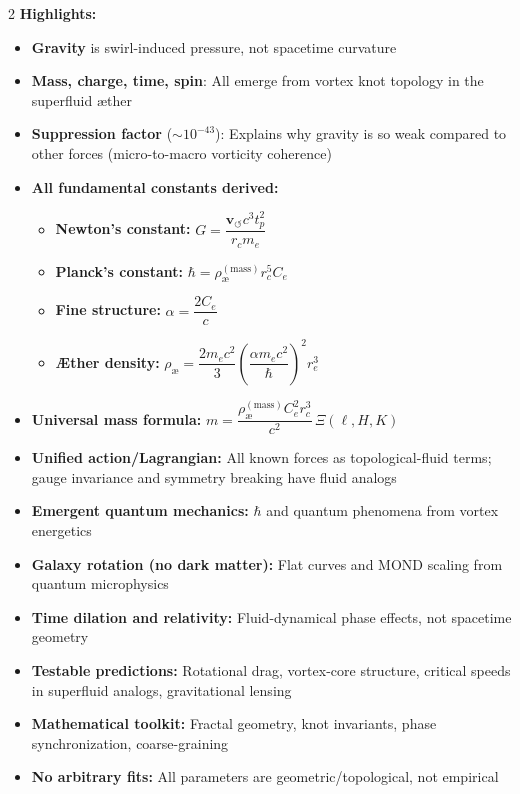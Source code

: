 \documentclass{article}
\begin{document}
\begin{center}
    \begin{multicols}{2}
        \footnotesize
        \textbf{Highlights:}
        \begin{itemize}
            \item \textbf{Gravity} is swirl-induced pressure, not spacetime curvature
            \item \textbf{Mass, charge, time, spin}: All emerge from vortex knot topology in the superfluid æther
            \item \textbf{Suppression factor} ($\sim 10^{-43}$): Explains why gravity is so weak compared to other forces (micro-to-macro vorticity coherence)
            \item \textbf{All fundamental constants derived:}
            \begin{itemize}
                \item \textbf{Newton's constant:} $G = \dfrac{\mathbf{v}_{\scriptscriptstyle\boldsymbol{\circlearrowleft}} c^3 t_p^2}{r_c m_e}$
                \item \textbf{Planck's constant:} $\hbar = \rho_{\text{\ae}}^{(\text{mass})} r_c^5 C_e$
                \item \textbf{Fine structure:} $\alpha = \dfrac{2 C_e}{c}$
                \item \textbf{Æther density:} $\rho_{\text{\ae}} = \dfrac{2 m_e c^2}{3} \left(\dfrac{\alpha m_e c^2}{\hbar}\right)^2 r_e^3$
            \end{itemize}
            \item \textbf{Universal mass formula:} $m = \dfrac{\rho_{\text{\ae}}^{(\text{mass})} C_e^2 r_c^3}{c^2} \, \Xi(\ell, H, K)$
            \item \textbf{Unified action/Lagrangian:} All known forces as topological-fluid terms; gauge invariance and symmetry breaking have fluid analogs
            \item \textbf{Emergent quantum mechanics:} $\hbar$ and quantum phenomena from vortex energetics
            \item \textbf{Galaxy rotation (no dark matter):} Flat curves and MOND scaling from quantum microphysics
            \item \textbf{Time dilation and relativity:} Fluid-dynamical phase effects, not spacetime geometry
            \item \textbf{Testable predictions:} Rotational drag, vortex-core structure, critical speeds in superfluid analogs, gravitational lensing
            \item \textbf{Mathematical toolkit:} Fractal geometry, knot invariants, phase synchronization, coarse-graining
            \item \textbf{No arbitrary fits:} All parameters are geometric/topological, not empirical
        \end{itemize}
    \end{multicols}
    \end{center}
\end{document}
